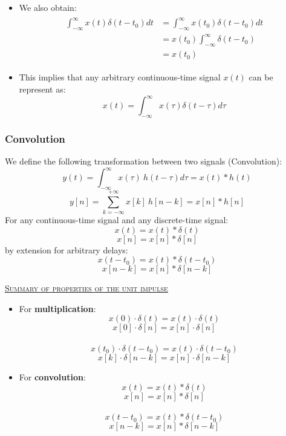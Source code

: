 \documentclass[12pt,a4paper]{article}
\begin{document}
 \begin{itemize}
\item We also obtain:
\begin{align*}\begin{split}
\int_{-\infty}^{\infty} x(t)\delta(t-t_{0})dt &= \int_{-\infty}^{\infty} x(t_{0})\delta(t-t_{0})dt \\
&= x(t_{0})\int_{-\infty}^{\infty} \delta(t-t_{0})\\
&= x(t_{0}) 
\end{split}
\end{align*}
\item This implies that any arbitrary continuous-time signal $x(t)$ can be represent as:
\[ x(t) = \int_{-\infty}^{\infty} x(\tau)\delta(t-\tau)d\tau \]
\end{itemize}

\subsubsection{Convolution}
We define the following transformation between two signals (Convolution):
\[ y(t) = \int_{-\infty}^{\infty} x(\tau) \ h(t-\tau)d\tau = x(t)*h(t) \]
\[ y[n] = \sum_{k=-\infty}^{+\infty}x[k] \ h[n-k] = x[n]*h[n] \]
For any continuous-time signal and any discrete-time signal:
\[ x(t) = x(t) * \delta(t) \]
\[ x[n] = x[n] * \delta[n] \]
by extension for arbitrary delays:
\[ x(t-t_{0}) = x(t) * \delta(t-t_{0}) \]
\[ x[n-k] = x[n] * \delta[n-k] \]

\begin{tcolorbox}[breakable]
 \underline{\textsc{Summary of properties of the unit impulse}}
 \begin{itemize}
  \item For \textbf{multiplication}:
   \[ x(0)\cdot \delta(t) = x(t)\cdot \delta(t) \]
   \[ x[0]\cdot \delta[n] = x[n]\cdot \delta[n] \]
\ \\ 
   \[ x(t_{0})\cdot \delta(t-t_{0}) = x(t)\cdot \delta(t-t_{0}) \]
   \[ x[k]\cdot \delta[n-k] = x[n] \cdot \delta[n-k] \]
  \item For \textbf{convolution}:
   \[ x(t) = x(t)*\delta(t) \]
   \[ x[n] = x[n]*\delta[n] \]
\ \\
   \[  x(t-t_{0}) = x(t)* \delta(t-t_{0}) \]
   \[ x[n-k] = x[n]*\delta[n-k] \]
 \end{itemize}
\end{tcolorbox} 
\end{document}
